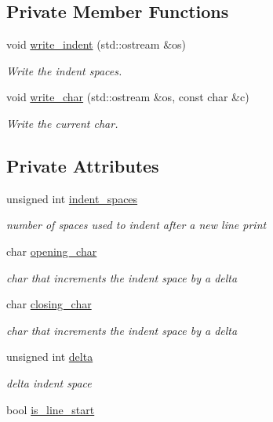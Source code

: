 \subsection*{Private Member Functions}
\begin{DoxyCompactItemize}
\item 
void \hyperlink{classsimple__indent_aad9458b42a0de8b0f22dcf9c171b935f}{write\+\_\+indent} (std\+::ostream \&os)
\begin{DoxyCompactList}\small\item\em Write the indent spaces. \end{DoxyCompactList}\item 
void \hyperlink{classsimple__indent_a945ebea4ab143178d2664fa746cb0228}{write\+\_\+char} (std\+::ostream \&os, const char \&c)
\begin{DoxyCompactList}\small\item\em Write the current char. \end{DoxyCompactList}\end{DoxyCompactItemize}
\subsection*{Private Attributes}
\begin{DoxyCompactItemize}
\item 
unsigned int \hyperlink{classsimple__indent_accc69ae9d9ad959ae711a7cf9243d7d7}{indent\+\_\+spaces}
\begin{DoxyCompactList}\small\item\em number of spaces used to indent after a new line print \end{DoxyCompactList}\item 
char \hyperlink{classsimple__indent_a47bb56e9b42182e8c35a2ff77e7dcb69}{opening\+\_\+char}
\begin{DoxyCompactList}\small\item\em char that increments the indent space by a delta \end{DoxyCompactList}\item 
char \hyperlink{classsimple__indent_a820d3dfc133cae5da3daf3ea1aa1c57f}{closing\+\_\+char}
\begin{DoxyCompactList}\small\item\em char that increments the indent space by a delta \end{DoxyCompactList}\item 
unsigned int \hyperlink{classsimple__indent_a47dad96c1bd62b3fb2499c57b680c70d}{delta}
\begin{DoxyCompactList}\small\item\em delta indent space \end{DoxyCompactList}\item 
bool \hyperlink{classsimple__indent_a15aa364252fa38fff21e58f665176f80}{is\+\_\+line\+\_\+start}
\end{DoxyCompactItemize}


